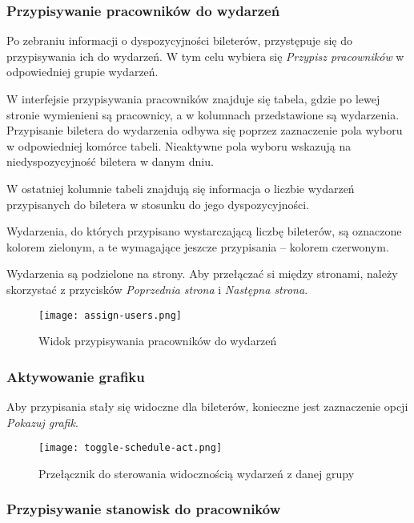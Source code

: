 \documentclass[shortabstract]{iithesis}
\begin{document}
\subsubsection{Przypisywanie pracowników do wydarzeń}

Po zebraniu informacji o dyspozycyjności bileterów, przystępuje się do przypisywania ich do wydarzeń. W tym celu wybiera się \textit{Przypisz pracowników} w odpowiedniej grupie wydarzeń.

W interfejsie przypisywania pracowników znajduje się tabela, gdzie po lewej stronie wymienieni są pracownicy, a w kolumnach przedstawione są wydarzenia. Przypisanie biletera do wydarzenia odbywa się poprzez zaznaczenie pola wyboru w odpowiedniej komórce tabeli. Nieaktywne pola wyboru wskazują na niedyspozycyjność biletera w danym dniu.

W ostatniej kolumnie tabeli znajdują się informacja o liczbie wydarzeń przypisanych do biletera w stosunku do jego dyspozycyjności.

Wydarzenia, do których przypisano wystarczającą liczbę bileterów, są oznaczone kolorem zielonym, a te wymagające jeszcze przypisania – kolorem czerwonym.

Wydarzenia są podzielone na strony. Aby przełączać si między stronami, należy skorzystać z przycisków \textit{Poprzednia strona} i \textit{Następna strona}.

\begin{figure}[h]
    \centering
    \texttt{[image: assign-users.png]}
    \caption{Widok przypisywania pracowników do wydarzeń}
    \label{fig:enter-label}
\end{figure}

\subsubsection{Aktywowanie grafiku}

Aby przypisania stały się widoczne dla bileterów, konieczne jest zaznaczenie opcji \textit{Pokazuj grafik}.

\begin{figure}[h]
    \centering
    \texttt{[image: toggle-schedule-act.png]}
    \caption{Przełącznik do sterowania widocznością wydarzeń z danej grupy}
    \label{fig:enter-label}
\end{figure}


\subsubsection{Przypisywanie stanowisk do pracowników}
\end{document}
